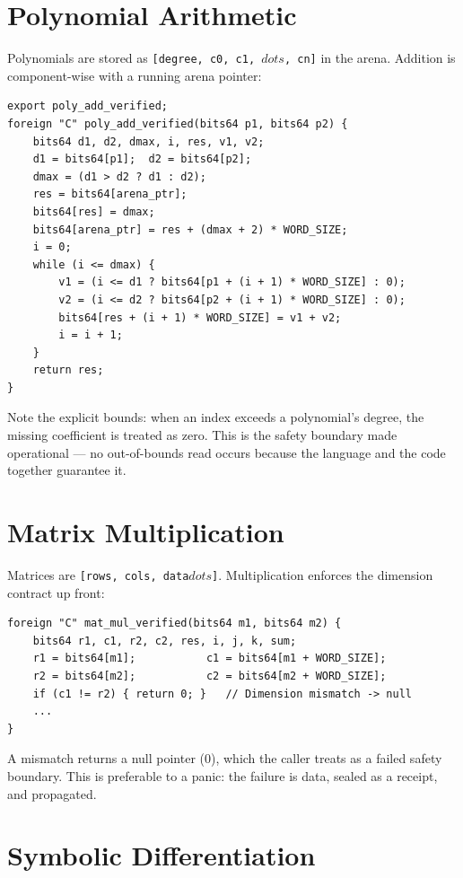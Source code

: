 \section{Polynomial Arithmetic}
\label{sec:cmm-poly}

Polynomials are stored as \texttt{[degree, c0, c1, \ensuremath{dots}, cn]} in the arena.
Addition is component-wise with a running arena pointer:
\begin{lstlisting}[language=CM,caption={Verified polynomial addition (verified\_kernel.cm).},label=lst:cmm-poly]
export poly_add_verified;
foreign "C" poly_add_verified(bits64 p1, bits64 p2) {
    bits64 d1, d2, dmax, i, res, v1, v2;
    d1 = bits64[p1];  d2 = bits64[p2];
    dmax = (d1 > d2 ? d1 : d2);
    res = bits64[arena_ptr];
    bits64[res] = dmax;
    bits64[arena_ptr] = res + (dmax + 2) * WORD_SIZE;
    i = 0;
    while (i <= dmax) {
        v1 = (i <= d1 ? bits64[p1 + (i + 1) * WORD_SIZE] : 0);
        v2 = (i <= d2 ? bits64[p2 + (i + 1) * WORD_SIZE] : 0);
        bits64[res + (i + 1) * WORD_SIZE] = v1 + v2;
        i = i + 1;
    }
    return res;
}
\end{lstlisting}
Note the explicit bounds: when an index exceeds a polynomial's degree, the
missing coefficient is treated as zero. This is the safety boundary made
operational --- no out-of-bounds read occurs because the language and the
code together guarantee it.

\section{Matrix Multiplication}
\label{sec:cmm-mat}

Matrices are \texttt{[rows, cols, data\ensuremath{dots}]}. Multiplication enforces the
dimension contract up front:
\begin{lstlisting}[language=CM,caption={Dimension-checked matrix multiply (verified\_kernel.cm).},label=lst:cmm-mat]
foreign "C" mat_mul_verified(bits64 m1, bits64 m2) {
    bits64 r1, c1, r2, c2, res, i, j, k, sum;
    r1 = bits64[m1];           c1 = bits64[m1 + WORD_SIZE];
    r2 = bits64[m2];           c2 = bits64[m2 + WORD_SIZE];
    if (c1 != r2) { return 0; }   // Dimension mismatch -> null
    ...
}
\end{lstlisting}
A mismatch returns a null pointer (0), which the caller treats as a failed
safety boundary. This is preferable to a panic: the failure is data, sealed as
a receipt, and propagated.

\section{Symbolic Differentiation}
\label{sec:cmm-diff}

